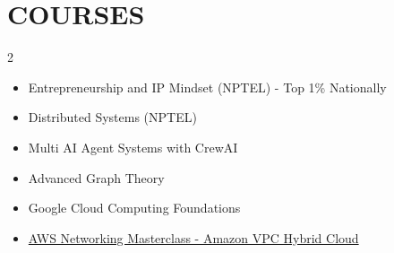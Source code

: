 \section*{COURSES}
\begin{multicols}{2}
\begin{itemize}
  \item Entrepreneurship and IP Mindset (NPTEL) - Top 1\% Nationally
  \item Distributed Systems (NPTEL)
  \item Multi AI Agent Systems with CrewAI
  \item Advanced Graph Theory
  \item Google Cloud Computing Foundations
  \item \href{https://www.udemy.com/certificate/UC-3a51039f-8873-4de4-90c9-b16a7262a896/}{AWS Networking Masterclass - Amazon VPC Hybrid Cloud}
\end{itemize}
\end{multicols}